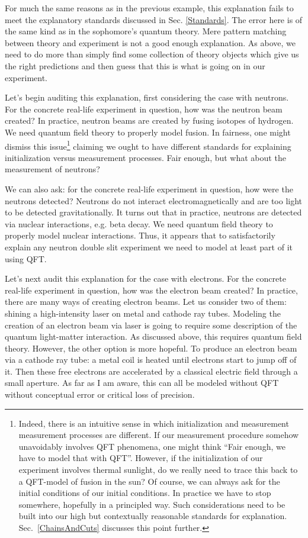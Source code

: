 \documentclass[12pt,prd,superscriptaddress,floatfix,amsmath,amssymb,amsfonts,nofootinbib]{revtex4-2}
\begin{document}
For much the same reasons as in the previous example, this explanation fails to meet the explanatory standards discussed in Sec. \ref{Standards}. The error here is of the same kind as in the sophomore's quantum theory. Mere pattern matching between theory and experiment is not a good enough explanation. As above, we need to do more than simply find some collection of theory objects which give us the right predictions and then guess that this is what is going on in our experiment.

Let's begin auditing this explanation, first considering the case with neutrons. For the concrete real-life experiment in question, how was the neutron beam created? In practice, neutron beams are created by fusing isotopes of hydrogen. We need quantum field theory to properly model fusion. In fairness, one might dismiss this issue\footnote{Indeed, there is an intuitive sense in which initialization and measurement measurement processes are different. If our measurement procedure somehow unavoidably involves QFT phenomena, one might think ``Fair enough, we have to model that with QFT''. However, if the initialization of our experiment involves thermal sunlight, do we really need to trace this back to a QFT-model of fusion in the sun? Of course, we can always ask for the initial conditions of our initial conditions. In practice we have to stop somewhere, hopefully in a principled way. Such considerations need to be built into our high but contextually reasonable standards for explanation. Sec.~\ref{ChainsAndCuts} discusses this point further.} claiming we ought to have different standards for explaining initialization versus measurement processes. Fair enough, but what about the measurement of neutrons?

We can also ask: for the concrete real-life experiment in question, how were the neutrons detected? Neutrons do not interact electromagnetically and are too light to be detected gravitationally. It turns out that in practice, neutrons are detected via nuclear interactions, e.g. beta decay. We need quantum field theory to properly model nuclear interactions. Thus, it appears that to satisfactorily explain any neutron double slit experiment we need to model at least part of it using QFT.

Let's next audit this explanation for the case with electrons. For the concrete real-life experiment in question, how was the electron beam created? In practice, there are many ways of creating electron beams. Let us consider two of them: shining a high-intensity laser on metal and cathode ray tubes. Modeling the creation of an electron beam via laser is going to require some description of the quantum light-matter interaction. As discussed above, this requires quantum field theory. However, the other option is more hopeful. To produce an electron beam via a cathode ray tube: a metal coil is heated until electrons start to jump off of it. Then these free electrons are accelerated by a classical electric field through a small aperture. As far as I am aware, this can all be modeled without QFT without conceptual error or critical loss of precision.
\end{document}
